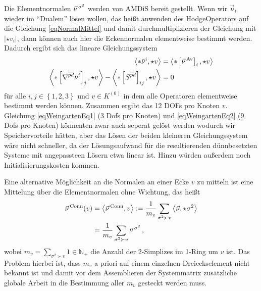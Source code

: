     Die Elementnormalen \( \vec{\nu}^{\,\sigma^{2}} \) werden von AMDiS bereit gestellt.
    Wenn wir \( \vec{\nu}_{i} \) wieder im "`Dualem"' lösen wollen, das heißt anwenden des HodgeOperators auf die Gleichung
    \eqref{eqNormalMittel} und damit durchmultiplizieren der Gleichung mit \( \left| \star v_{i} \right| \), dann können auch hier die
    Eckennormalen elementweise bestimmt werden.
    Dadurch ergibt sich das lineare Gleichungssystem
    \begin{align}
        \label{eqWeingartenEq1}
        \left\langle *\bar{\nu}^{i} , \star v \right\rangle 
                &= \left\langle *\left[ \vec{\nu}^{\,\text{Av}} \right]_{i}, \star v \right\rangle \\
        \label{eqWeingartenEq2}
        \left\langle *\left[ \nabla^{\overline{pd}}\bar{\nu}^{i} \right]_{j} , \star v \right\rangle
            - \left\langle *\left[ S^{\overline{pd}} \right]_{ij} , \star v \right\rangle 
                &= 0
    \end{align}
    für alle \( i,j\in\left\{ 1,2,3 \right\} \) und \( v\in K^{(0)} \) in dem alle Operatoren elementweise bestimmt werden können.
    Zusammen ergibt das 12 DOFs pro Knoten \( v \).
    Gleichung \eqref{eqWeingartenEq1} (3 Dofs pro Knoten) und \eqref{eqWeingartenEq2} (9 Dofs pro Knoten) 
    könnenten zwar auch seperat gelöst werden wodurch wir
    Speichervorteile hätten, aber das Lösen der beiden kleineren Gleichungssystem wäre nicht schneller, da der Lösungsaufwand für die
    resultierenden dünnbesetzten Systeme mit angepassteen Lösern etwa linear ist.
    Hinzu würden außerdem noch Initialisierungskosten kommen.

    Eine alternative Möglichkeit an die Normalen an einer Ecke \( v \) zu mitteln ist eine Mittelung über die Elementnormalen ohne
    Wichtung, das heißt
    \begin{align}
      \label{eqNormalConnMittel}
      \begin{aligned}
      \vec{\nu}^{\,\text{Conn}}(v) &= \left\langle \vec{\nu}^{\,\text{Conn}}, v \right\rangle 
          := \frac{1}{m_{v}} \sum_{\sigma^{2}\succ v}
                      \left\langle \vec{\nu}, \star\sigma^{2} \right\rangle \\
          &= \frac{1}{m_{v}} \sum_{\sigma^{2}\succ v}
                                          \vec{\nu}^{\,\sigma^{2}} \,\text{,}
     \end{aligned}
    \end{align}
    wobei \( m_{v} = \sum_{\sigma^{2}\succ v} 1 \in \mathds{N}_{+}\) die Anzahl der \( 2 \)-Simplizes im 1-Ring um \( v \) ist.
    Das Problem hierbei ist, dass \( m_{v} \) a priori auf einem einzelnen Dreieckselement nicht bekannt ist und damit vor dem Assemblieren
    der Systemmatrix zusätzliche globale Arbeit in die Bestimmung aller \( m_{v} \) gesteckt werden muss.
    
